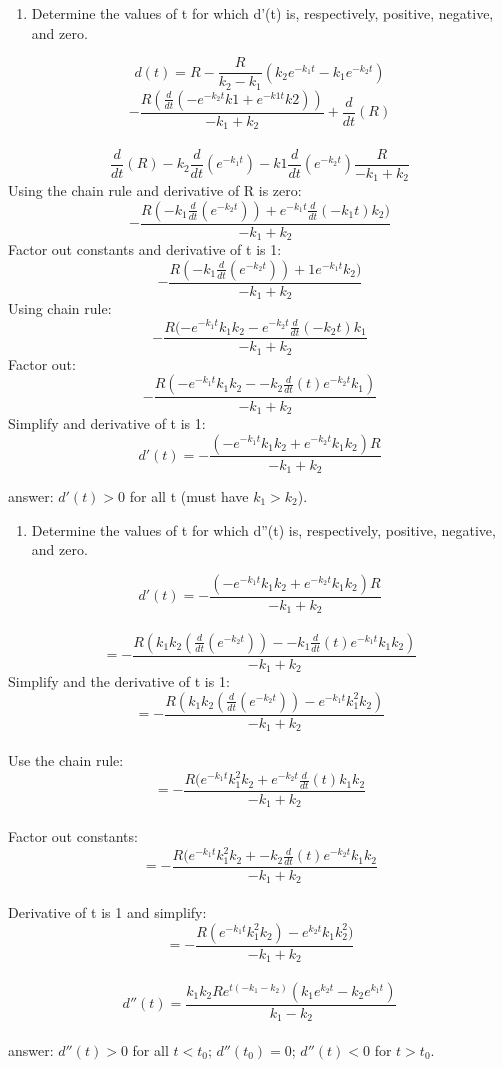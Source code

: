 \documentclass[]{article}
\providecommand{\tightlist}{%
  \setlength{\itemsep}{0pt}\setlength{\parskip}{0pt}}
\begin{document}
\begin{enumerate}
\def\labelenumi{(\alph{enumi})}
\tightlist
\item
  Determine the values of t for which d'(t) is, respectively, positive,
  negative, and zero.
\end{enumerate}

\[d(t) = R - \frac{R}{k_2 - k_1}(k_2 e ^{-k_1 t} - k_1 e^{-k_2 t})\]
\[- \frac{R (\frac{d}{dt} (-e^{-k_2 t} k1 + e^{-k1t}k2))}{-k_1 + k_2} + \frac{d}{dt} (R)\]\\
\[\frac{d}{dt}(R) - k_2 \frac{d}{dt}(e^{-k_1 t})-k1\frac{d}{dt}(e^{-k_2 t})\frac{R}{-k_1 + k_2}\]
Using the chain rule and derivative of R is zero:
\[- \frac{R(-k_1 \frac{d}{dt}(e^{-k_2 t})) + e^{-k_1 t}\frac{d}{dt}(-k_1 t)k_2)}{-k_1 + k_2}\]
Factor out constants and derivative of t is 1:
\[- \frac{R(-k_1 \frac{d}{dt}(e^{-k_2 t})) + 1e^{-k_1 t}k_2)}{-k_1 + k_2}\]
Using chain rule:
\[- \frac{R(-e^{-k_1 t}k_1 k_2 - e^{-k_2 t} \frac{d}{dt} (-k_2 t)k_1}{-k_1 + k_2}\]
Factor out:
\[- \frac{R(-e^{-k_1 t}k_1 k_2 - -k_2 \frac{d}{dt}(t)e^{-k_2 t}k_1)}{-k_1 + k_2}\]
Simplify and derivative of t is 1:
\[d'(t) = -\frac{(-e^{-k_1 t}k_1 k_2 + e^{-k_2 t}k_1 k_2)R}{-k_1 + k_2}\]

answer: \(d'(t) > 0\) for all t (must have \(k_1 > k_2\)).

\begin{enumerate}
\def\labelenumi{(\alph{enumi})}
\setcounter{enumi}{1}
\tightlist
\item
  Determine the values of t for which d''(t) is, respectively, positive,
  negative, and zero.
\end{enumerate}

\[d'(t) = -\frac{(-e^{-k_1 t}k_1 k_2 + e^{-k_2 t}k_1 k_2)R}{-k_1 + k_2}\]\\
\[= -\frac{R(k_1 k_2 (\frac{d}{dt}(e^{-k_2 t})) - -k_1 \frac{d}{dt}(t)e^{-k_1 t}k_1 k_2 )}{-k_1 + k_2}\]
Simplify and the derivative of t is 1:
\[= -\frac{R(k_1 k_2 (\frac{d}{dt}(e^{-k_2 t})) - e^{-k_1 t}k_1^2 k_2 )}{-k_1 + k_2}\]\\
Use the chain rule:
\[= -\frac{R(e^{-k_1 t}k_1^2 k_2 + e^{-k_2 t} \frac{d}{dt}(t)k_1 k_2 }{-k_1 + k_2}\]\\
Factor out constants:
\[= -\frac{R(e^{-k_1 t}k_1^2 k_2 + - k_2 \frac{d}{dt}(t) e^{-k_2 t}k_1 k_2} {-k_1 + k_2}\]\\
Derivative of t is 1 and simplify:
\[= - \frac{R (e^{-k_1 t}k_1^2 k_2) - e^{k_2 t} k_1 k_2^2)}{-k_1 + k_2}\]\\
\[d''(t) = \frac{k_1 k_2 R e^{t(-k_1-k_2)}(k_1 e^{k_2 t}-k_2 e^{k_1 t})}{k_1 - k_2}\]\\
answer: \(d''(t) > 0\) for all \(t < t_0\); \(d''(t_0) =0\);
\(d''(t) < 0\) for \(t > t_0\).
\end{document}
